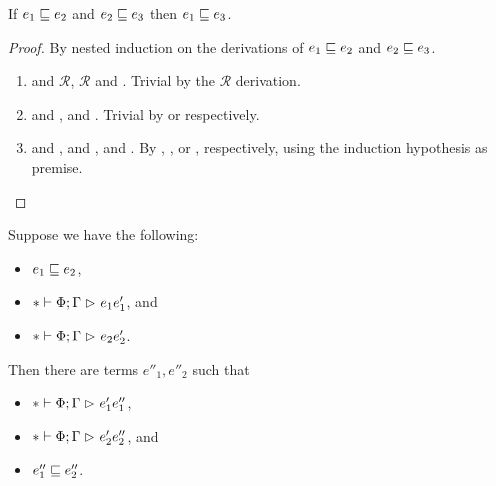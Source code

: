 \begin{lemma} \label{lem:transitivity-acum}
If $e_1 \mathrel{\sqsubseteq} e_2$ and $e_2 \mathrel{\sqsubseteq} e_3$ then $e_1 \mathrel{\sqsubseteq} e_3$.
\end{lemma}

\begin{proof}
By nested induction on the derivations of $e_1 \mathrel{\sqsubseteq} e_2$ and $e_2 \mathrel{\sqsubseteq} e_3$.
\begin{enumerate}[noitemsep, label=\textbf{Cases}, leftmargin=*, labelindent=\parindent]
  \item {} and $\mathcal{R}$, $\mathcal{R}$ and .
    Trivial by the $\mathcal{R}$ derivation.
  \item {} and ,  and .
    Trivial by  or  respectively.
  \item {} and ,  and ,  and .
    By , , or , respectively,
    using the induction hypothesis as premise. \qedhere
\end{enumerate}
\end{proof}

\begin{lemma} \label{lem:confluence-acum}
Suppose we have the following:
\begin{itemize}[noitemsep]
  \item $e_1 \mathrel{\sqsubseteq} e_2$,
  \item $* \mathrel{\vdash} \Phi; \Gamma \mathrel{\rhd}_{} e_1{e'_1}$, and
  \item $* \mathrel{\vdash} \Phi; \Gamma \mathrel{\rhd}_{} e_2{e'_2}$.
\end{itemize}
Then there are terms $e''_1, e''_2$ such that
\begin{itemize}[noitemsep]
  \item $* \mathrel{\vdash} \Phi; \Gamma \mathrel{\rhd}_{} e'_1{e''_1}$,
  \item $* \mathrel{\vdash} \Phi; \Gamma \mathrel{\rhd}_{} e'_2{e''_2}$, and
  \item $e''_1 \mathrel{\sqsubseteq} e''_2$.
\end{itemize}
\end{lemma}

